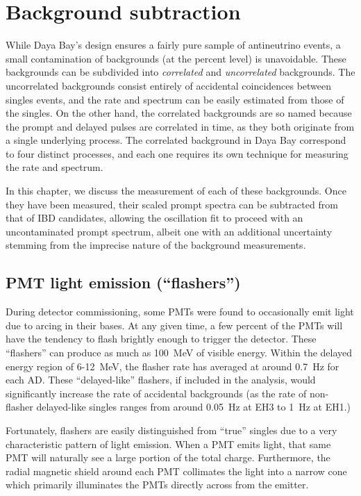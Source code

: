 \documentclass[../thesis.tex]{subfiles}
\begin{document}
\chapter{Background subtraction}
\label{chap:bkg}

While Daya Bay's design ensures a fairly pure sample of antineutrino events, a
small contamination of backgrounds (at the percent level) is unavoidable. These
backgrounds can be subdivided into \emph{correlated} and \emph{uncorrelated}
backgrounds. The uncorrelated backgrounds consist entirely of accidental
coincidences between singles events, and the rate and spectrum can be easily
estimated from those of the singles. On the other hand, the correlated
backgrounds are so named because the prompt and delayed pulses are correlated in
time, as they both originate from a single underlying process. The correlated
background in Daya Bay correspond to four distinct processes, and each one
requires its own technique for measuring the rate and spectrum.

In this chapter, we discuss the measurement of each of these backgrounds. Once
they have been measured, their scaled prompt spectra can be subtracted from that
of IBD candidates, allowing the oscillation fit to proceed with an
uncontaminated prompt spectrum, albeit one with an additional uncertainty
stemming from the imprecise nature of the background measurements.

\section{PMT light emission (``flashers'')}
\label{sec:flashers}

During detector commissioning, some PMTs were found to occasionally emit light
due to arcing in their bases. At any given time, a few percent of the PMTs will
have the tendency to flash brightly enough to trigger the detector. These
``flashers'' can produce as much as 100~MeV of visible energy. Within the
delayed energy region of 6-12~MeV, the flasher rate has averaged at around
0.7~Hz for each AD. These ``delayed-like'' flashers, if included in the
analysis, would significantly increase the rate of accidental backgrounds (as
the rate of non-flasher delayed-like singles ranges from around 0.05~Hz at EH3
to 1~Hz at EH1.)

Fortunately, flashers are easily distinguished from ``true'' singles due to a
very characteristic pattern of light emission. When a PMT emits light, that same
PMT will naturally see a large portion of the total charge. Furthermore, the
radial magnetic shield around each PMT collimates the light into a narrow cone
which primarily illuminates the PMTs directly across from the emitter.
\end{document}
